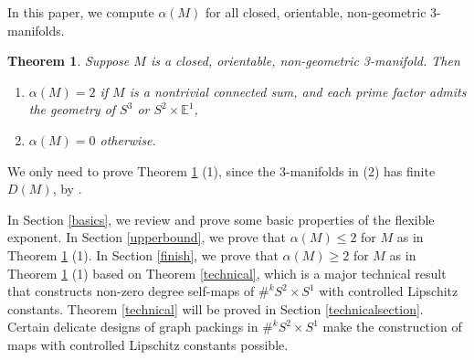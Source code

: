 \documentclass{amsart}
\newtheorem{thm}{Theorem}[section]
\begin{document}
  
       
           
In this paper, we compute  $\alpha(M)$ for all closed, orientable, non-geometric 3-manifolds.
       
       \begin{thm}\label{non-geometric} Suppose $M$ is a closed, orientable, non-geometric 3-manifold. 
        Then 
 \begin{enumerate}        
  \item       $\alpha(M)= 2$ if $M$ is a nontrivial connected sum, and  each prime factor admits the geometry of  
    $S^3$ or $S^2\times \mathbb{E}^1$, 
     \item     $\alpha(M)=0$ otherwise.
    \end{enumerate} 
      
         \end{thm} 
         
We only need to prove Theorem \ref{non-geometric} (1), since the $3$-manifolds in (2) has finite $D(M)$, by  \cite[Corollary 4.3]{Wang}.
         
In Section \ref{basics}, we review and prove some basic properties of the flexible exponent. In Section \ref{upperbound}, we prove that $\alpha(M)\leq 2$ for $M$ as in Theorem \ref{non-geometric} (1).  In Section \ref{finish}, we prove that $\alpha(M)\geq 2$ for $M$ as in Theorem \ref{non-geometric} (1) based on Theorem \ref{technical}, which is a major technical result that constructs non-zero degree self-maps of $\#^kS^2\times S^1$ with controlled Lipschitz constants. Theorem \ref{technical}  will be proved in Section \ref{technicalsection}.
Certain delicate designs of graph packings in $\#^k S^2\times S^1$
make the construction  of   maps with controlled Lipschitz constants   possible.  
\end{document}
